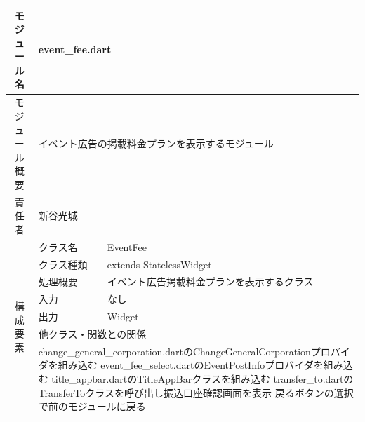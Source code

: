 \begin{table}[H]
  \centering
  \begin{tabular}{|c|l|l|} \hline
    モジュール名                & \multicolumn{2}{l|}{event\_fee.dart}                                                                   \\ \hline
    モジュール概要               & \multicolumn{2}{p{12cm}|}{イベント広告の掲載料金プランを表示するモジュール}                                                    \\ \hline
    責任者                   & \multicolumn{2}{l|}{新谷光城}                                                                              \\ \hline
    \multirow{7}{*}{構成要素} & クラス名                                                & EventFee                                         \\ \cline{2-3}
                          & クラス種類                                               & extends StatelessWidget                          \\ \cline{2-3}
                          & 処理概要                                                & \multicolumn{1}{p{12cm}|}{イベント広告掲載料金プランを表示するクラス} \\ \cline{2-3}
                          & 入力                                                  & なし                                               \\ \cline{2-3}
                          & 出力                                                  & Widget                                           \\ \cline{2-3}
                          & \multicolumn{2}{l|}{他クラス・関数との関係}                                                                       \\ \cline{2-3}
                          & \multicolumn{2}{p{14cm}|}{
      change\_general\_corporation.dartのChangeGeneralCorporationプロバイダを組み込む
      \newline event\_fee\_select.dartのEventPostInfoプロバイダを組み込む
      \newline title\_appbar.dartのTitleAppBarクラスを組み込む
      \newline transfer\_to.dartのTransferToクラスを呼び出し振込口座確認画面を表示
      \newline 戻るボタンの選択で前のモジュールに戻る
    }                                                                                                                              \\ \hline
  \end{tabular}
\end{table}


